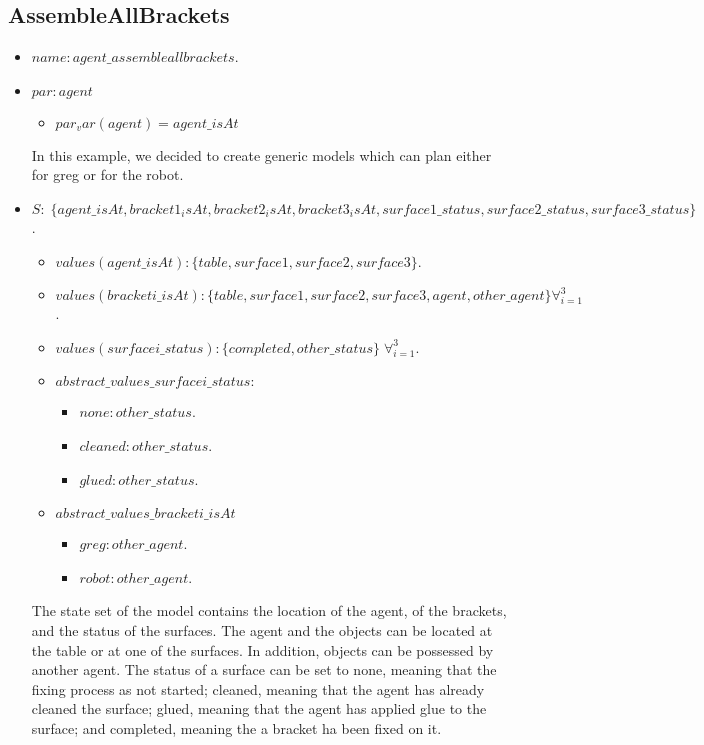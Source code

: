 \subsection{AssembleAllBrackets} 
\begin{itemize}
	\item $name: agent\_assembleallbrackets$.
	\item		$par: agent$
		\begin{itemize}
			\item $par_var(agent)=agent\_isAt$
		\end{itemize}
		In this example, we decided to create generic models which can plan either for greg or for the robot.
	\item $S:\;\{agent\_isAt,bracket1_isAt,bracket2_isAt,bracket3_isAt,surface1\_status,surface2\_status,surface3\_status\}$. 
		\begin{itemize}
			\item $values(agent\_isAt):\{table,surface1,surface2,surface3\}$.
			\item $values(bracketi\_isAt):\{table,surface1,surface2,surface3,agent,other\_agent\} \forall_{i=1}^3$. 
			\item $values(surfacei\_status):\{completed,other\_status\}\;\forall_{i=1}^3$.
		\end{itemize}
		\begin{itemize}
			\item $abstract\_values\_surfacei\_status:$ 
				\begin{itemize}
					\item $none: other\_status$.
					\item $cleaned: other\_status$.
					\item $glued: other\_status$.
				\end{itemize}
			\item $abstract\_values\_bracketi\_isAt$ 
				\begin{itemize}
					\item $greg: other\_agent$.
					\item $robot: other\_agent$.
				\end{itemize}	
		\end{itemize}
		The state set of the model contains the location of the agent, of the brackets, and the status of the surfaces. The agent and the objects can be located at the table or at one of the surfaces. In addition, objects can be possessed by another agent. The status of a surface can be set to none, meaning that the fixing process as not started; cleaned, meaning that the agent has already cleaned the surface; glued, meaning that the agent has applied glue to the surface; and completed, meaning the a bracket ha been fixed on it. 


\end{itemize}
